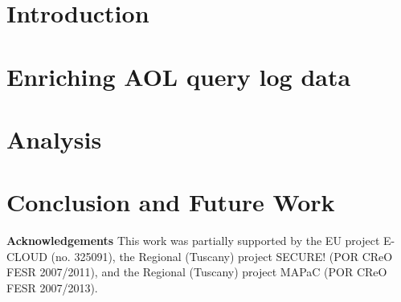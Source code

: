 \documentclass{style/sig-alternate-2013}[9pt]
\newcommand{\comment}[2]{[\textbf{\color{red} #1}: \emph{#2}]\\}%
\newcommand{\manisha}[1]{\comment{manisha}{#1}}
\begin{document}
\section{Introduction}





%

\section{Enriching AOL query log data}



\section{Analysis}
%


\section{Conclusion and Future Work}





\vspace{0.1cm}
 \noindent
{ \footnotesize
{\bf {Acknowledgements}} This work was partially supported by the EU project E-CLOUD (no. 325091), the Regional (Tuscany) project SECURE! (POR CReO FESR 2007/2011),
and the Regional (Tuscany) project MAPaC (POR CReO FESR 2007/2013).
}

\scriptsize


\balancecolumns
\end{document}
